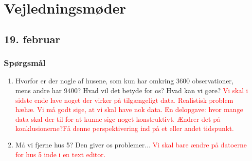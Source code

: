 \chapter{Vejledningsmøder}

\section{19. februar}

\subsection{Spørgsmål}
\begin{enumerate}
    \item Hvorfor er der nogle af husene, som kun har omkring 3600 observationer, mens andre har 9400? Hvad vil det betyde for os? Hvad kan vi gøre? \textcolor{red}{Vi skal i sidste ende lave noget der virker på tilgængeligt data. Realistisk problem hæhæ. Vi må godt sige, at vi skal have nok data. En delopgave: hvor mange data skal der til for at kunne sige noget konstruktivt. Ændrer det på konklusionerne?Få denne perspektivering ind på et eller andet tidspunkt.}
    \item Må vi fjerne hus 5? Den giver os problemer... \textcolor{red}{Vi skal bare ændre på datoerne for hus 5 inde i en text editor.}
\end{enumerate}

